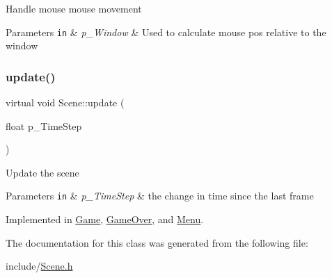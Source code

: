 Handle mouse mouse movement 
\begin{DoxyParams}[1]{Parameters}
\mbox{\tt in}  & {\em p\+\_\+\+Window} & Used to calculate mouse pos relative to the window \\
\hline
\end{DoxyParams}
\mbox{\label{class_scene_a461d21cd952c7dd0556850a3fc95a760}} 
\subsubsection{\texorpdfstring{update()}{update()}}
{\footnotesize\ttfamily virtual void Scene\+::update (\begin{DoxyParamCaption}\item[{float}]{p\+\_\+\+Time\+Step }\end{DoxyParamCaption})\hspace{0.3cm}{\ttfamily [pure virtual]}}

Update the scene 
\begin{DoxyParams}[1]{Parameters}
\mbox{\tt in}  & {\em p\+\_\+\+Time\+Step} & the change in time since the last frame \\
\hline
\end{DoxyParams}


Implemented in \hyperlink{class_game_a3fd12339411955db6a5445ba213ef293}{Game}, \hyperlink{class_game_over_a6b9465b5c095a1de0e467baf17045fac}{Game\+Over}, and \hyperlink{class_menu_a8043b25a060513367b0e286d3ae397d2}{Menu}.



The documentation for this class was generated from the following file\+:\begin{DoxyCompactItemize}
\item 
include/\hyperlink{_scene_8h}{Scene.\+h}\end{DoxyCompactItemize}
